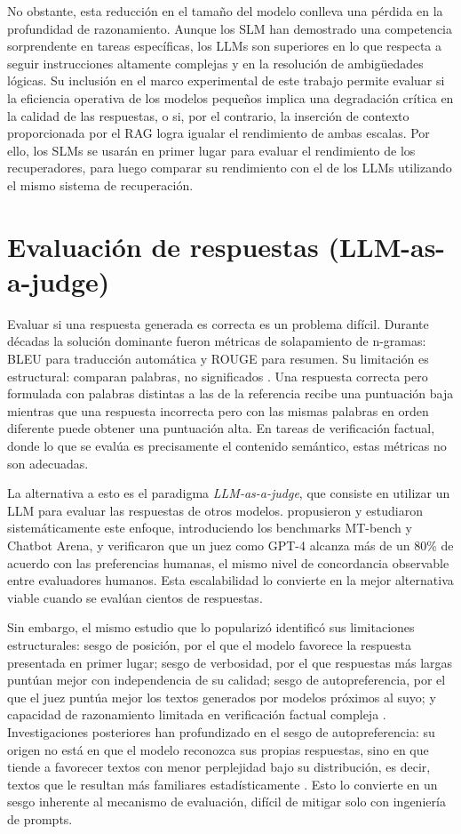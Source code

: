 No obstante, esta reducción en el tamaño del modelo conlleva una pérdida en la profundidad de razonamiento. Aunque los SLM han demostrado una competencia sorprendente en tareas específicas, los LLMs son superiores en lo que respecta a seguir instrucciones altamente complejas y en la resolución de ambigüedades lógicas. Su inclusión en el marco experimental de este trabajo permite evaluar si la eficiencia operativa de los modelos pequeños implica una degradación crítica en la calidad de las respuestas, o si, por el contrario, la inserción de contexto proporcionada por el RAG logra igualar el rendimiento de ambas escalas. Por ello, los SLMs se usarán en primer lugar para evaluar el rendimiento de los recuperadores, para luego comparar su rendimiento con el de los LLMs utilizando el mismo sistema de recuperación.

\section{Evaluación de respuestas (LLM-as-a-judge)}

Evaluar si una respuesta generada es correcta es un problema difícil. Durante décadas la solución dominante fueron métricas de solapamiento de n-gramas: BLEU para traducción automática y ROUGE para resumen. Su limitación es estructural: comparan palabras, no significados \cite{zheng2023judging}. Una respuesta correcta pero formulada con palabras distintas a las de la referencia recibe una puntuación baja mientras que una respuesta incorrecta pero con las mismas palabras en orden diferente puede obtener una puntuación alta. En tareas de verificación factual, donde lo que se evalúa es precisamente el contenido semántico, estas métricas no son adecuadas.

La alternativa a esto es el paradigma \textit{LLM-as-a-judge}, que consiste en utilizar un LLM para evaluar las respuestas de otros modelos. \citet{zheng2023judging} propusieron y estudiaron sistemáticamente este enfoque, introduciendo los benchmarks MT-bench y Chatbot Arena, y verificaron que un juez como GPT-4 alcanza más de un 80\% de acuerdo con las preferencias humanas, el mismo nivel de concordancia observable entre evaluadores humanos. Esta escalabilidad lo convierte en la mejor alternativa viable cuando se evalúan cientos de respuestas.

Sin embargo, el mismo estudio que lo popularizó identificó sus limitaciones estructurales: sesgo de posición, por el que el modelo favorece la respuesta presentada en primer lugar; sesgo de verbosidad, por el que respuestas más largas puntúan mejor con independencia de su calidad; sesgo de autopreferencia, por el que el juez puntúa mejor los textos generados por modelos próximos al suyo; y capacidad de razonamiento limitada en verificación factual compleja \cite{zheng2023judging}. Investigaciones posteriores han profundizado en el sesgo de autopreferencia: su origen no está en que el modelo reconozca sus propias respuestas, sino en que tiende a favorecer textos con menor perplejidad bajo su distribución, es decir, textos que le resultan más familiares estadísticamente \cite{wataoka2024selfpref}. Esto lo convierte en un sesgo inherente al mecanismo de evaluación, difícil de mitigar solo con ingeniería de prompts.

